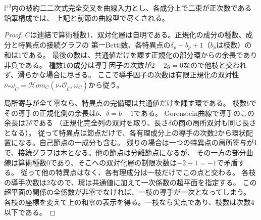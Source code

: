 \begin{corollary}[被約二二次式完全交叉の曲線型]\label{cor:reduced-quartic-conductor}
$\mathbb P^3$内の被約二二次式完全交叉を曲線入力とし、各成分上で二束が正次数である鉛筆構成では、
上記と前節の曲線型で尽くされる。
\end{corollary}
\begin{proof}
$C$は連結で算術種数1、双対化層は自明である。正規化の成分の種数、成分と特異点の接続グラフの
第一Betti数、各特異点の$\delta_p-b_p+1$（$b_p$は枝数）の和は1である。
最後の数は、共通値だけを課す正規化の部分環からの余長であり非負である。
種数1の成分は導手因子の次数が$2-2g=0$なので他枝と交われず、滑らかな場合に尽きる。
ここで導手因子の次数は有限正規化の双対性
$\nu_*\omega_{\widetilde C}=\mathcal Hom_C(\nu_*\mathcal O_{\widetilde C},\omega_C)$から従う。

局所寄与が全て零なら、特異点の完備環は共通値だけを課す環である。
枝数$b$でその導手の正規化側の余長は$b$、$\delta=b-1$である。
Gorenstein曲線で導手のこの余長は$2\delta$である
（正規化完全列の双対を取り、長さ$\delta$の商の局所双対も同じ長さとなる）。
従って特異点は節点だけで、各有理成分上の導手の次数2から環状配置になる。自己節点の一成分も含む。
残りの場合は一つの特異点の局所寄与が1で、接続グラフは木となる。他の節点は分離節点になるが、
その一方の部分曲線は算術種数0であり、そこへの双対化層の制限次数は$-2+1=-1$で矛盾する。
従って他の特異点はなく、各有理成分は一枝だけでこの点と交わる。
各枝の導手次数は2なので、環は共通値に加えて一次係数の超平面を指定する。
この超平面の関係の全係数が非零でなければ、一枝の導手が一次となってしまう。
各枝の座標を変えて上の和零の表示を得る。一枝なら尖点であり、枝数は次数4以下である。
\end{proof}
